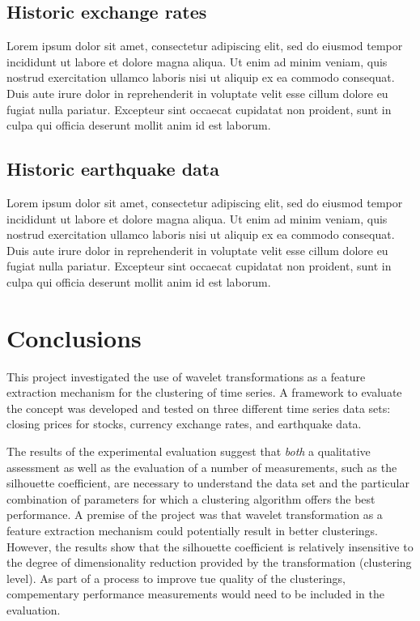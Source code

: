 \documentclass{article}
\begin{document}
\subsection{Historic exchange rates}
Lorem ipsum dolor sit amet, consectetur adipiscing elit, sed do eiusmod tempor incididunt ut labore et dolore magna aliqua. Ut enim ad minim veniam, quis nostrud exercitation ullamco laboris nisi ut aliquip ex ea commodo consequat. Duis aute irure dolor in reprehenderit in voluptate velit esse cillum dolore eu fugiat nulla pariatur. Excepteur sint occaecat cupidatat non proident, sunt in culpa qui officia deserunt mollit anim id est laborum.


\subsection{Historic earthquake data}
Lorem ipsum dolor sit amet, consectetur adipiscing elit, sed do eiusmod tempor incididunt ut labore et dolore magna aliqua. Ut enim ad minim veniam, quis nostrud exercitation ullamco laboris nisi ut aliquip ex ea commodo consequat. Duis aute irure dolor in reprehenderit in voluptate velit esse cillum dolore eu fugiat nulla pariatur. Excepteur sint occaecat cupidatat non proident, sunt in culpa qui officia deserunt mollit anim id est laborum.



\section{Conclusions}

This project investigated the use of wavelet transformations as a feature extraction mechanism for the clustering of time series. A framework to evaluate the concept was developed and tested on three different time series data sets: closing prices for stocks, currency exchange rates, and earthquake data.

The results of the experimental evaluation suggest that {\em both} a qualitative assessment as well as the evaluation of a number of measurements, such as the silhouette coefficient, are necessary to understand the data set and the particular combination of parameters for which a clustering algorithm offers the best performance. A premise of the project was that wavelet transformation as a feature extraction mechanism could potentially result in better clusterings. However, the results show that the silhouette coefficient is relatively insensitive to the degree of dimensionality reduction provided by the transformation (clustering level). As part of a process to improve tue quality of the clusterings, compementary performance measurements would need to be included in the evaluation.
\end{document}
